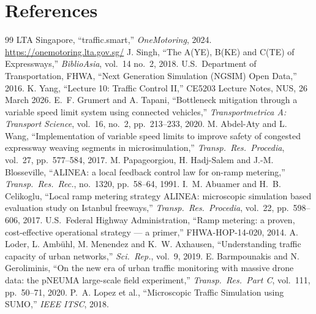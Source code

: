 \documentclass[11pt,a4paper]{article}
\begin{document}
\section*{References}
\renewcommand{\section}[2]{}%
\begin{thebibliography}{99}
\small
{} LTA Singapore, ``traffic.smart,'' \emph{OneMotoring}, 2024. \url{https://onemotoring.lta.gov.sg/}
 J. Singh, ``The A(YE), B(KE) and C(TE) of Expressways,'' \emph{BiblioAsia}, vol.~14 no.~2, 2018.
 U.S.\ Department of Transportation, FHWA, ``Next Generation Simulation (NGSIM) Open Data,'' 2016.
 K. Yang, ``Lecture 10: Traffic Control II,'' CE5203 Lecture Notes, NUS, 26 March 2026.
 E.~F. Grumert and A. Tapani, ``Bottleneck mitigation through a variable speed limit system using connected vehicles,'' \emph{Transportmetrica A: Transport Science}, vol.~16, no.~2, pp.~213--233, 2020.
 M. Abdel-Aty and L. Wang, ``Implementation of variable speed limits to improve safety of congested expressway weaving segments in microsimulation,'' \emph{Transp.\ Res.\ Procedia}, vol.~27, pp.~577--584, 2017.
 M. Papageorgiou, H. Hadj-Salem and J.-M. Blosseville, ``ALINEA: a local feedback control law for on-ramp metering,'' \emph{Transp.\ Res.\ Rec.}, no.~1320, pp.~58--64, 1991.
 I.~M. Abuamer and H.~B. Celikoglu, ``Local ramp metering strategy ALINEA: microscopic simulation based evaluation study on Istanbul freeways,'' \emph{Transp.\ Res.\ Procedia}, vol.~22, pp.~598--606, 2017.
 U.S.\ Federal Highway Administration, ``Ramp metering: a proven, cost-effective operational strategy --- a primer,'' FHWA-HOP-14-020, 2014.
 A. Loder, L. Amb\"uhl, M. Menendez and K.~W. Axhausen, ``Understanding traffic capacity of urban networks,'' \emph{Sci.\ Rep.}, vol.~9, 2019.
 E. Barmpounakis and N. Geroliminis, ``On the new era of urban traffic monitoring with massive drone data: the pNEUMA large-scale field experiment,'' \emph{Transp.\ Res.\ Part C}, vol.~111, pp.~50--71, 2020.
 P.~A. Lopez et al., ``Microscopic Traffic Simulation using SUMO,'' \emph{IEEE ITSC}, 2018.
\end{thebibliography}
\end{document}
